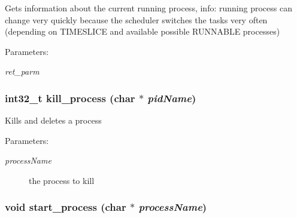 Gets information about the current running process, info: running process can change very quickly because the scheduler switches the tasks very often (depending on TIMESLICE and available possible RUNNABLE processes) \begin{Desc}
\item[Parameters:]
\begin{description}
\item[{\em ret\_\-parm}]\end{description}
\end{Desc}
\hypertarget{group___h_s_y_s_t_e_m___a_p_i_g13bb69d9873dac8fb09bc47becdda0a4}{
\subsubsection[{kill\_\-process}]{\setlength{\rightskip}{0pt plus 5cm}int32\_\-t kill\_\-process (char $\ast$ {\em pidName})}}
\label{group___h_s_y_s_t_e_m___a_p_i_g13bb69d9873dac8fb09bc47becdda0a4}


Kills and deletes a process \begin{Desc}
\item[Parameters:]
\begin{description}
\item[{\em processName}]the process to kill \end{description}
\end{Desc}
\hypertarget{group___h_s_y_s_t_e_m___a_p_i_g9d888d0cd06a14252c4b3358ad2e8fdd}{
\subsubsection[{start\_\-process}]{\setlength{\rightskip}{0pt plus 5cm}void start\_\-process (char $\ast$ {\em processName})}}
\label{group___h_s_y_s_t_e_m___a_p_i_g9d888d0cd06a14252c4b3358ad2e8fdd}


